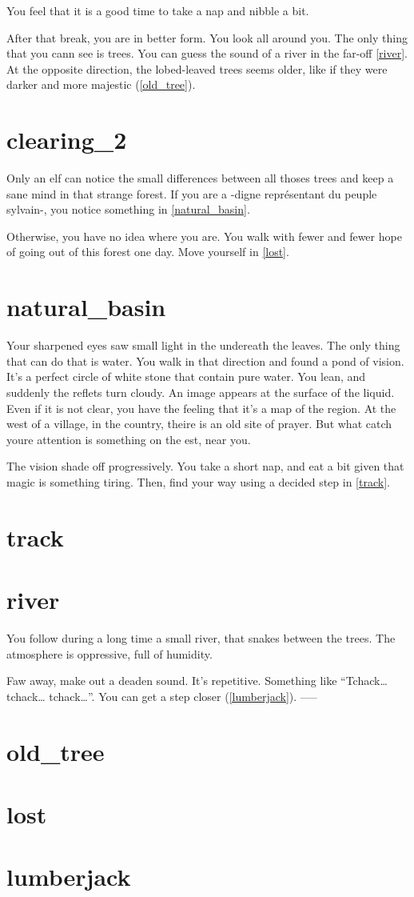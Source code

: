 You feel that it is a good time to take a nap and nibble a bit.

After that break, you are in better form. You look all around you. The only
thing that you cann see is trees. You can guess the sound of a river in the
far-off \ref{river}. At the opposite direction, the lobed-leaved trees seems
older, like if they were darker and more majestic (\ref{old_tree}).

\section{clearing_2}

Only an elf can notice the small differences between all thoses trees and keep a
sane mind in that strange forest. If you are a -digne représentant du peuple
sylvain-, you notice something in \ref{natural_basin}.

Otherwise, you have no idea where you are. You walk with fewer and fewer hope of
going out of this forest one day. Move yourself in \ref{lost}.

\section{natural_basin}

Your sharpened eyes saw small light in the undereath the leaves. The only
thing that can do that is water. You walk in that direction and found a pond
of vision. It's a perfect circle of white stone that contain pure water. You
lean, and suddenly the reflets turn cloudy. An image appears at
the surface of the liquid. Even if it is not clear, you have the feeling that
it's a map of the region. At the west of a village, in the country, theire is an
old site of prayer. But what catch youre attention is something on the est,
near you.

The vision shade off progressively. You take a short nap, and eat a bit
given that magic is something tiring. Then, find your way using a decided step
in \ref{track}.

\section{track}
\section{river}

You follow during a long time a small river, that snakes between the trees.
The atmosphere is oppressive, full of humidity.

Faw away, make out a deaden sound. It's repetitive. Something like
``Tchack… tchack… tchack…''. You can get a step closer (\ref{lumberjack}).
-----
\section{old_tree}
\section{lost}
\section{lumberjack}
